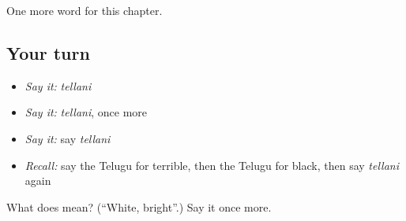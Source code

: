 \begin{grammarlens}[title={What you've built}]
One more word for this chapter.
\end{grammarlens}

\subsection*{Your turn}
\begin{itemize}
\raggedright
  \item \emph{Say it:} \emph{tellani}
  \item \emph{Say it:} \emph{tellani}, once more
  \item \emph{Say it:} say \emph{tellani}
  \item \emph{Recall:} say the Telugu for terrible, then the Telugu for black, then say \emph{tellani} again
\end{itemize}

\begin{tcolorbox}[breakable,colback=teal!4,colframe=teal!35!black,title={Before you move on}]
What does  mean? (\textquotedblleft{}White, bright\textquotedblright{}.) Say it once more.
\end{tcolorbox}
